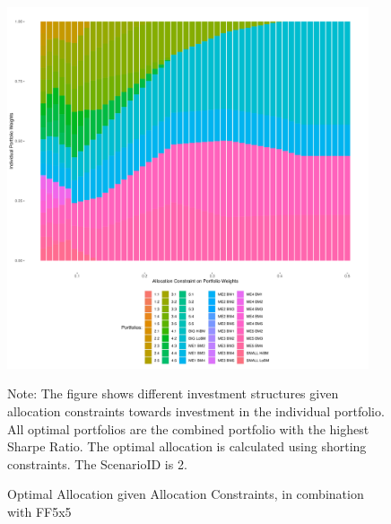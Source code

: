 \begin{figure}
	\centering
	
	\caption[Optimal Allocation]{Optimal Allocation given Allocation Constraints, in combination with FF5x5}
	\label{fig:optimalloc}
	
	\includegraphics[width=0.95\textwidth]{./Plots/optimalallocation_SharpeRatio_entireperiod_2.png}
	
	{\small Note: The figure shows different investment structures given allocation constraints towards investment in the individual portfolio. All optimal portfolios are the combined portfolio with the highest Sharpe Ratio. The optimal allocation is calculated using shorting constraints. The ScenarioID is 2.}
\end{figure}






